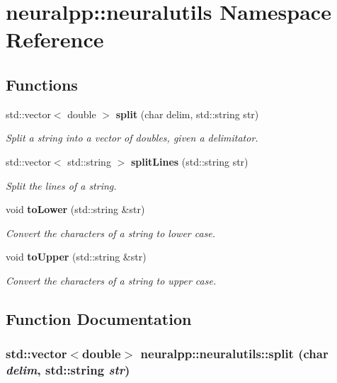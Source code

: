 \section{neuralpp::neuralutils Namespace Reference}
\label{namespaceneuralpp_1_1neuralutils}


\subsection*{Functions}
\begin{CompactItemize}
\item 
std::vector$<$ double $>$ {\bf split} (char delim, std::string str)
\begin{CompactList}\small\item\em Split a string into a vector of doubles, given a delimitator. \item\end{CompactList}\item 
std::vector$<$ std::string $>$ {\bf splitLines} (std::string str)
\begin{CompactList}\small\item\em Split the lines of a string. \item\end{CompactList}\item 
void {\bf toLower} (std::string \&str)
\begin{CompactList}\small\item\em Convert the characters of a string to lower case. \item\end{CompactList}\item 
void {\bf toUpper} (std::string \&str)
\begin{CompactList}\small\item\em Convert the characters of a string to upper case. \item\end{CompactList}\end{CompactItemize}


\subsection{Function Documentation}
\subsubsection[split]{\setlength{\rightskip}{0pt plus 5cm}std::vector$<$double$>$ neuralpp::neuralutils::split (char {\em delim}, \/  std::string {\em str})}\label{namespaceneuralpp_1_1neuralutils_68719b3d63ca48ed264e1b730a1aaa4a}


